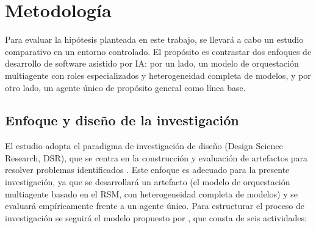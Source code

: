 \section{Metodología}
\label{sec:metodologia}

Para evaluar la hipótesis planteada en este trabajo, se llevará a cabo un estudio comparativo en un entorno controlado. El propósito es contrastar dos enfoques de desarrollo de software asistido por IA: por un lado, un modelo de orquestación multiagente con roles especializados y heterogeneidad completa de modelos, y por otro lado, un agente único de propósito general como línea base.

\subsection{Enfoque y diseño de la investigación}
El estudio adopta el paradigma de investigación de diseño (Design Science Research, DSR), que se centra en la construcción y evaluación de artefactos para resolver problemas identificados \parencite{hevner2004design}. Este enfoque es adecuado para la presente investigación, ya que se desarrollará un artefacto (el modelo de orquestación multiagente basado en el RSM, con heterogeneidad completa de modelos) y se evaluará empíricamente frente a un agente único. Para estructurar el proceso de investigación se seguirá el modelo propuesto por \textcite{peffers2007design}, que consta de seis actividades:
